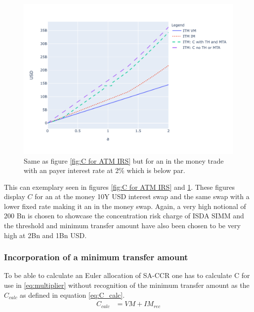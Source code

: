 \documentclass[../Thesis_AHoecherl.tex]{subfiles}
\begin{document}
    \begin{figure}
        \centering
        \includegraphics{Graphics/C_and_its_components_for_ITM_IRS.pdf}
        \caption{Same as figure \ref{fig:C for ATM IRS} but for an in the money trade with an payer interest rate at 2\% which is below par.}
        \label{fig:C for ITM IRS}
    \end{figure}

    This can exemplary seen in figures \ref{fig:C for ATM IRS} and \ref{fig:C for ITM IRS}. These figures display $C$ for an at the money 10Y USD interest swap and the same swap with a lower fixed rate making it an in the money swap. Again, a very high notional of 200 Bn is chosen to showcase the concentration risk charge of ISDA SIMM and the threshold and minimum transfer amount have also been chosen to be very high at 2Bn and 1Bn USD.

    \subsubsection{Incorporation of a minimum transfer amount}

     To be able to calculate an Euler allocation of SA-CCR one has to calculate C for use in \ref{eq:multiplier} without recognition of the minimum transfer amount as the $C_{calc}$ as defined in equation \ref{eq:C_calc}.
    \begin{align}
        \label{eq:C_calc}
        C_{calc} &= VM + IM_{rec}
    \end{align}
    
\end{document}
